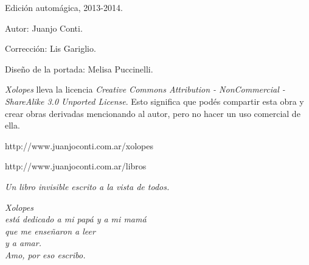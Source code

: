\documentclass[12pt,twoside,openright,a5paper]{book}
\begin{document}

\pagestyle{plain}

%
%




\thispagestyle{empty}
\noindent
Edición automágica, 2013-2014.\\

\vspace{0.5cm}

\noindent
Autor: Juanjo Conti.

\noindent
Corrección: Lis Gariglio.

\noindent
Diseño de la portada: Melisa Puccinelli.


\vspace{1cm}

\noindent
\emph{Xolopes} lleva la licencia 
\emph{Creative Commons Attribution - NonCommercial - ShareAlike 3.0 Unported License}.
Esto significa que podés compartir esta obra y crear obras derivadas
mencionando al autor, pero no ha\-cer un uso comercial de ella.

\vfill

\noindent
http://www.juanjoconti.com.ar/xolopes

\vspace{0.5cm}
\noindent
http://www.juanjoconti.com.ar/libros

\cleardoublepage

\begin{center}
\vspace*{\fill}
\emph{Un libro invisible escrito a la vista de todos.}
\vspace*{\fill}
\end{center}

\cleardoublepage

\noindent
\begin{flushright}
\emph{
\emph{Xolopes} \\está dedicado a mi papá y a mi mamá\\
que me enseñaron a leer \\y a amar.\\
\vspace{0.5cm}
Amo, por eso escribo.
}

\end{flushright}
\end{document}
